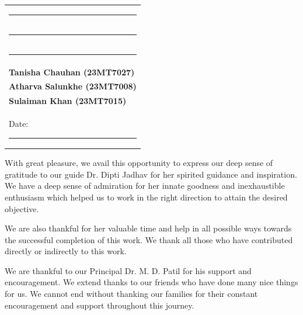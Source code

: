 \vspace{0.4in}

\begin{flushright}
\begin{tabular}{l}
\rule{6cm}{0.4pt} \\
\rule{6cm}{0.4pt} \\
\rule{6cm}{0.4pt} \\
\textbf{Tanisha Chauhan (23MT7027)} \\
\textbf{Atharva Salunkhe (23MT7008)} \\
\textbf{Sulaiman Khan (23MT7015)} \\[0.3cm]
Date: \rule{4cm}{0.4pt}
\end{tabular}
\end{flushright}

\newpage


\vspace{0.4in}

\noindent With great pleasure, we avail this opportunity to express our deep sense of gratitude to our guide Dr. Dipti Jadhav for her spirited guidance and inspiration. We have a deep sense of admiration for her innate goodness and inexhaustible enthusiasm which helped us to work in the right direction to attain the desired objective.

\medskip

\noindent We are also thankful for her valuable time and help in all possible ways towards the successful completion of this work. We thank all those who have contributed directly or indirectly to this work.

\medskip

\noindent We are thankful to our Principal Dr. M. D. Patil for his support and encouragement. We extend thanks to our friends who have done many nice things for us. We cannot end without thanking our families for their constant encouragement and support throughout this journey.

